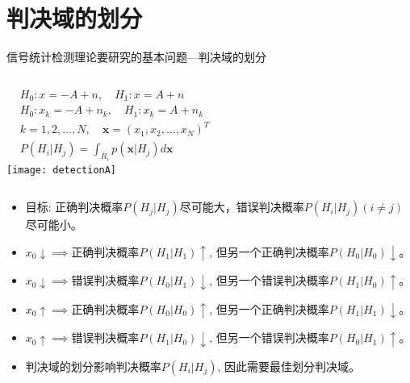 \section{判决域的划分}

\begin{frame}{信号统计检测理论要研究的基本问题---判决域的划分}
\begin{columns}
	\begin{align*}
	&H_0: x=-A+n,\quad H_1: x=A+n\\
	&H_0: x_k=-A+n_k,\quad H_1: x_k=A+n_k\\
	&k=1,2,\dots,N,\quad \bm{x}=(x_1,x_2,\dots,x_N)^{T}\\
	&P(H_i|H_j)=\int_{R_i}p(\bm{x}|H_j)d\bm{x}
	\end{align*}
	\texttt{[image: detectionA]}
\end{columns}
\begin{itemize}
	\item 目标: 正确判决概率$P(H_j|H_j)$尽可能大，错误判决概率$P(H_i|H_j)(i\ne j)$尽可能小。
	\item $x_0\downarrow\implies$正确判决概率$P(H_1|H_1)\uparrow$, 但另一个正确判决概率$P(H_0|H_0)\downarrow$。
	\item $x_0\downarrow\implies$错误判决概率$P(H_0|H_1)\downarrow$, 但另一个错误判决概率$P(H_1|H_0)\uparrow$。
	\item $x_0\uparrow\implies$正确判决概率$P(H_0|H_0)\uparrow$, 但另一个正确判决概率$P(H_1|H_1)\downarrow$。
	\item $x_0\uparrow\implies$错误判决概率$P(H_1|H_0)\downarrow$, 但另一个错误判决概率$P(H_0|H_1)\uparrow$。
	\item 判决域的划分影响判决概率$P(H_i|H_j)$, 因此需要最佳划分判决域。
\end{itemize}
\end{frame}

